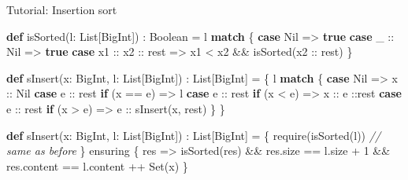 \documentclass[
  ignorenonframetext,
]{beamer}
\newenvironment{Shaded}{}{}
\newcommand{\CommentTok}[1]{\textcolor[rgb]{0.38,0.63,0.69}{\textit{#1}}}
\newcommand{\DecValTok}[1]{\textcolor[rgb]{0.25,0.63,0.44}{#1}}
\newcommand{\FunctionTok}[1]{\textcolor[rgb]{0.02,0.16,0.49}{#1}}
\newcommand{\KeywordTok}[1]{\textcolor[rgb]{0.00,0.44,0.13}{\textbf{#1}}}
\newcommand{\NormalTok}[1]{#1}
\begin{document}
\begin{frame}[fragile]{Tutorial: Insertion sort}
\protect\hypertarget{tutorial-insertion-sort}{}

\begin{Shaded}
\begin{Highlighting}[]
\KeywordTok{def} \FunctionTok{isSorted}\NormalTok{(l: List[BigInt]) : Boolean = l }\KeywordTok{match}\NormalTok{ \{}
  \KeywordTok{case}\NormalTok{ Nil              => }\KeywordTok{true}
  \KeywordTok{case}\NormalTok{ _ :: Nil         => }\KeywordTok{true}
  \KeywordTok{case}\NormalTok{ x1 :: x2 :: rest =>}
\NormalTok{    x1 < x2 && }\FunctionTok{isSorted}\NormalTok{(x2 :: rest)}
\NormalTok{\}}
\end{Highlighting}
\end{Shaded}

\end{frame}

\begin{frame}[fragile]

\begin{Shaded}
\begin{Highlighting}[]
\KeywordTok{def} \FunctionTok{sInsert}\NormalTok{(x: BigInt, l: List[BigInt]) : List[BigInt] = \{}
\NormalTok{  l }\KeywordTok{match}\NormalTok{ \{}
    \KeywordTok{case}\NormalTok{ Nil => x :: Nil}
    \KeywordTok{case}\NormalTok{ e :: rest }\KeywordTok{if}\NormalTok{ (x == e) => l}
    \KeywordTok{case}\NormalTok{ e :: rest }\KeywordTok{if}\NormalTok{ (x < e)  => x :: e ::rest}
    \KeywordTok{case}\NormalTok{ e :: rest }\KeywordTok{if}\NormalTok{ (x > e)  => e :: }\FunctionTok{sInsert}\NormalTok{(x, rest)}
\NormalTok{  \}}
\NormalTok{\}}
\end{Highlighting}
\end{Shaded}

\end{frame}

\begin{frame}[fragile]

\begin{Shaded}
\begin{Highlighting}[]
\KeywordTok{def} \FunctionTok{sInsert}\NormalTok{(x: BigInt, l: List[BigInt]) : List[BigInt] = \{}
  \FunctionTok{require}\NormalTok{(}\FunctionTok{isSorted}\NormalTok{(l))}
  \CommentTok{// same as before}
\NormalTok{\} ensuring \{ res =>}
  \FunctionTok{isSorted}\NormalTok{(res) &&}
\NormalTok{  res.}\FunctionTok{size}\NormalTok{ == l.}\FunctionTok{size}\NormalTok{ + }\DecValTok{1}\NormalTok{ &&}
\NormalTok{  res.}\FunctionTok{content}\NormalTok{ == l.}\FunctionTok{content}\NormalTok{ ++ Set(x)}
\NormalTok{\}}
\end{Highlighting}
\end{Shaded}

\end{frame}
\end{document}
